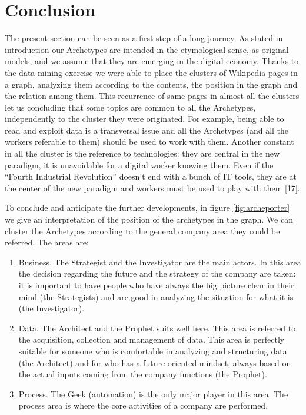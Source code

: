 \documentclass[]{book}
\providecommand{\tightlist}{%
  \setlength{\itemsep}{0pt}\setlength{\parskip}{0pt}}
\begin{document}
\section{Conclusion}\label{conclusion}

The present section can be seen as a first step of a long journey. As
stated in introduction our Archetypes are intended in the etymological
sense, as original models, and we assume that they are emerging in the
digital economy. Thanks to the data-mining exercise we were able to
place the clusters of Wikipedia pages in a graph, analyzing them
according to the contents, the position in the graph and the relation
among them. This recurrence of same pages in almost all the clusters let
us concluding that some topics are common to all the Archetypes,
independently to the cluster they were originated. For example, being
able to read and exploit data is a transversal issue and all the
Archetypes (and all the workers referable to them) should be used to
work with them. Another constant in all the cluster is the reference to
technologies: they are central in the new paradigm, it is unavoidable
for a digital worker knowing them. Even if the ``Fourth Industrial
Revolution'' doesn't end with a bunch of IT tools, they are at the
center of the new paradigm and workers must be used to play with them
{[}17{]}.

To conclude and anticipate the further developments, in figure
\ref{fig:archeporter} we give an interpretation of the position of the
archetypes in the graph. We can cluster the Archetypes according to the
general company area they could be referred. The areas are:

\begin{enumerate}
\def\labelenumi{\arabic{enumi}.}
\tightlist
\item
  Business. The Strategist and the Investigator are the main actors. In
  this area the decision regarding the future and the strategy of the
  company are taken: it is important to have people who have always the
  big picture clear in their mind (the Strategists) and are good in
  analyzing the situation for what it is (the Investigator).
\item
  Data. The Architect and the Prophet suits well here. This area is
  referred to the acquisition, collection and management of data. This
  area is perfectly suitable for someone who is comfortable in analyzing
  and structuring data (the Architect) and for who has a future-oriented
  mindset, always based on the actual inputs coming from the company
  functions (the Prophet).
\item
  Process. The Geek (automation) is the only major player in this area.
  The process area is where the core activities of a company are
  performed.
\end{enumerate}
\end{document}
